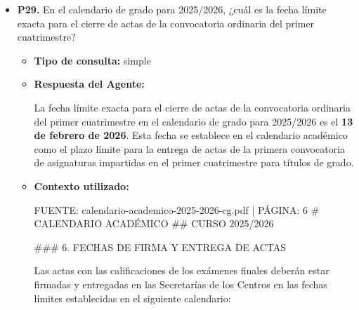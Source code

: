 \documentclass{article}
\begin{document}
\begin{itemize}
\begin{itemize}
\begin{scriptsize}
                  Acuerdo 4.2 CG/20-3-25 por el que se aprueba el Calendario Académico para el curso 2025-2026  Página 9 de 13
                \end{scriptsize}
        \end{itemize}


  \item \textbf{P29.} En el calendario de grado para 2025/2026, ¿cuál es la fecha límite exacta para el cierre de actas de la convocatoria ordinaria del primer cuatrimestre? \\
        \begin{itemize}
          \item \textbf{Tipo de consulta:} simple
          \item \textbf{Respuesta del Agente:}

                La fecha límite exacta para el cierre de actas de la convocatoria ordinaria del primer cuatrimestre en el calendario de grado para 2025/2026 es el \textbf{13 de febrero de 2026}. Esta fecha se establece en el calendario académico como el plazo límite para la entrega de actas de la primera convocatoria de asignaturas impartidas en el primer cuatrimestre para títulos de grado.
          \item \textbf{Contexto utilizado:}
                \begin{scriptsize}
                  FUENTE: calendario-academico-2025-2026-cg.pdf | PÁGINA: 6
                  \# CALENDARIO ACADÉMICO
                  \#\# CURSO 2025/2026

                  \#\#\# 6. FECHAS DE FIRMA Y ENTREGA DE ACTAS

                  Las actas con las calificaciones de los exámenes finales deberán estar firmadas y entregadas en las Secretarías de los Centros en las fechas límites establecidas en el siguiente calendario:


\end{scriptsize}
\end{itemize}
\end{itemize}
\end{document}
